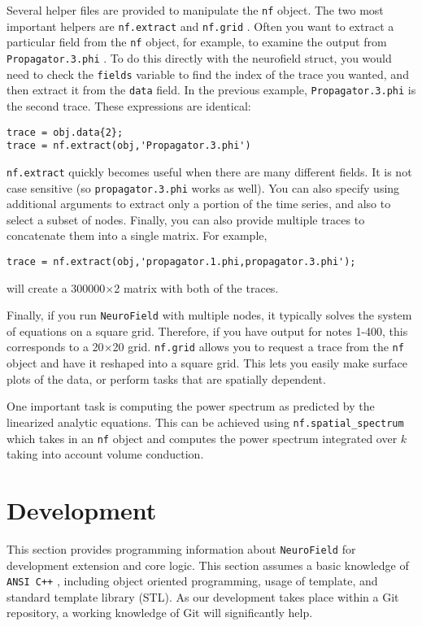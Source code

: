 \documentclass[12pt,a4paper]{article}
\newcommand{\type}[1]{{\small\small\tt #1} }
\newcommand{\NF}[0]{\type{NeuroField}}
\begin{document}
Several helper files are provided to manipulate the \type{nf} object. The two most important helpers are \type{nf.extract} and \type{nf.grid}. Often you want to extract a particular field from the \type{nf} object, for example, to examine the output from \type{Propagator.3.phi}. To do this directly with the neurofield struct, you would need to check the \type{fields} variable to find the index of the trace you wanted, and then extract it from the \type{data} field. In the previous example, \type{Propagator.3.phi} is the second trace. These expressions are identical:
\begin{lstlisting}
trace = obj.data{2};
trace = nf.extract(obj,'Propagator.3.phi')
\end{lstlisting}
\type{nf.extract} quickly becomes useful when there are many different fields. It is not case sensitive (so \type{propagator.3.phi} works as well). You can also specify using additional arguments to extract only a portion of the time series, and also to select a subset of nodes. Finally, you can also provide multiple traces to concatenate them into a single matrix. For example,
\begin{lstlisting}
trace = nf.extract(obj,'propagator.1.phi,propagator.3.phi');
\end{lstlisting}
will create a 300000$\times$2 matrix with both of the traces.

Finally, if you run \NF with multiple nodes, it typically solves the system of equations on a square grid. Therefore, if you have output for notes 1-400, this corresponds to a 20$\times$20 grid. \type{nf.grid} allows you to request a trace from the \type{nf} object and have it reshaped into a square grid. This lets you easily make surface plots of the data, or perform tasks that are spatially dependent.

One important task is computing the power spectrum as predicted by the linearized analytic equations. This can be achieved using \type{nf.spatial\_spectrum} which takes in an \type{nf} object and computes the power spectrum integrated over $k$ taking into account volume conduction.

\section{Development}

This section provides programming information about \NF for development extension and core logic. This section assumes a basic knowledge of \type{ANSI C++}, including object oriented programming, usage of template, and standard template library (STL). As our development takes place within a Git repository, a working knowledge of Git will significantly help.
\end{document}
